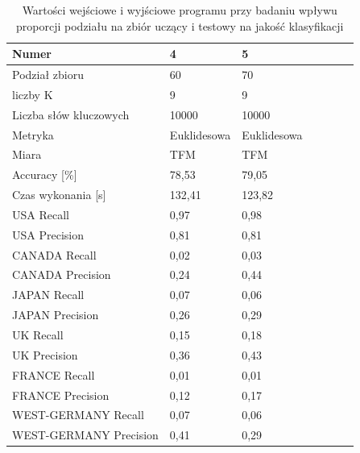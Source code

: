 \documentclass{classrep}
\begin{document}
{{            \begin{table}[!htbp]
                \centering
                \begin{tabular}{|l|l|l|l|l|l|l|}
                    \hline
                    Numer                    & 4                & 5        \\ \hline
                    Podział zbioru           & 60		        & 70		\\ \hline
                    liczby K                 & 9			    & 9		    \\ \hline
                    Liczba słów kluczowych   & 10000		    & 10000	    \\ \hline
                    Metryka                  & Euklidesowa	    & Euklidesowa \\ \hline
                    Miara                    & TFM		        & TFM		\\ \hline
                    Accuracy {[}\%{]}        & 78,53		    & 79,05	    \\ \hline
                    Czas wykonania {[}s{]}   & 132,41	        & 123,82	\\ \hline
                    USA Recall               & 0,97		        & 0,98		\\ \hline
                    USA Precision            & 0,81		        & 0,81		\\ \hline
                    CANADA Recall            & 0,02		        & 0,03		\\ \hline
                    CANADA Precision         & 0,24		        & 0,44		\\ \hline
                    JAPAN Recall             & 0,07		        & 0,06		\\ \hline
                    JAPAN Precision          & 0,26		        & 0,29		\\ \hline
                    UK Recall                & 0,15		        & 0,18		\\ \hline
                    UK Precision             & 0,36		        & 0,43		\\ \hline
                    FRANCE Recall            & 0,01		        & 0,01		\\ \hline
                    FRANCE Precision         & 0,12		        & 0,17		\\ \hline
                    WEST-GERMANY Recall      & 0,07		        & 0,06		\\ \hline
                    WEST-GERMANY Precision   & 0,41		        & 0,29		\\ \hline
                    \end{tabular}
                    \caption{Wartości wejściowe i wyjściowe programu przy badaniu wpływu proporcji podziału na zbiór uczący i testowy na jakość klasyfikacji} \label{table-podzial2}
                \end{table}
                \FloatBarrier

}}
\end{document}
